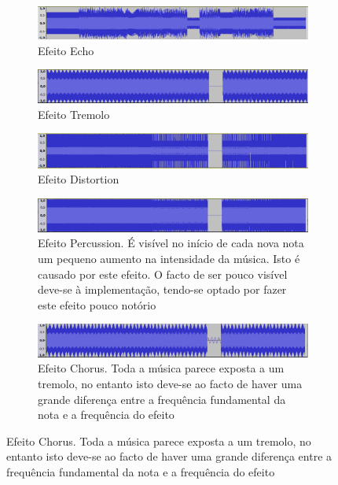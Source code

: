 \documentclass[a4paper,11pt,openright,oneside]{report}
\begin{document}
\begin{figure}
        \centering
        \begin{subfigure}[b]{1\textwidth}
                \includegraphics[width=\textwidth]{img/Echo}
                \caption{Efeito Echo}
                \label{fig:echo}
        \end{subfigure}
        
        \begin{subfigure}[b]{1\textwidth}
                \includegraphics[width=\textwidth]{img/Tremolo}
                \caption{Efeito Tremolo}
                \label{fig:tremolo}
        \end{subfigure}
        
        \begin{subfigure}[b]{1\textwidth}
                \includegraphics[width=\textwidth]{img/Distortion}
                \caption{Efeito Distortion}
                \label{fig:distortion}
        \end{subfigure}
        
        \begin{subfigure}[b]{1\textwidth}
                \includegraphics[width=\textwidth]{img/Percussion}
                \caption{Efeito Percussion. É visível no início de cada nova nota um pequeno aumento na intensidade da música. Isto é causado por este efeito. O facto de ser pouco visível deve-se à implementação, tendo-se optado por fazer este efeito pouco notório}
                \label{fig:percussion}
        \end{subfigure}
        
        \begin{subfigure}[b]{1\textwidth}
                \includegraphics[width=\textwidth]{img/Chorus}
                \caption{Efeito Chorus. Toda a música parece exposta a um tremolo, no entanto isto deve-se ao facto de haver uma grande diferença entre a frequência fundamental da nota e a frequência do efeito}
                \label{fig:chorus}
        \end{subfigure}
        

\end{figure}
\end{document}
